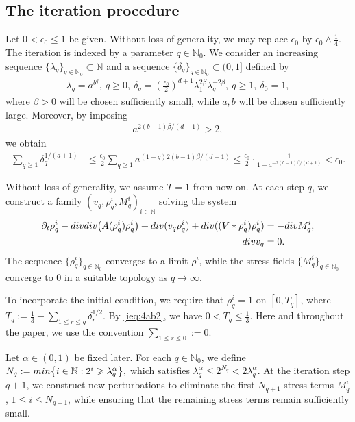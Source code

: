 \documentclass[10pt,a4paper]{amsart}
\numberwithin{equation}{section}
\def\min{{\mathord{{\rm min}}}}
\def\geq{\geqslant}
\def\leq{\leqslant}
\def\div{\mathord{{\rm div}}}
\def\min{{\mathord{{\rm min}}}}
\def\geq{\geqslant}
\def\leq{\leqslant}
\def\div{\mathord{{\rm div}}}
\begin{document}
\subsection{The iteration procedure}
Let $0<\epsilon_0\leq 1$ be given. Without loss of generality, we may replace $\epsilon_0$ by
$
\epsilon_0\wedge \frac14.
$ The iteration is indexed by a parameter
$
q\in\mathbb{N}_0.
$
We consider an increasing sequence
$
\{\lambda_q\}_{q\in\mathbb{N}_0}\subset\mathbb{N}
$
and a sequence
$
\{\delta_q\}_{q\in\mathbb{N}_0}\subset(0,1]
$
defined by
\begin{align*}
\lambda_q
=
a^{b^q},
\ 
q\geq0,
\ 
\delta_q
=
(\frac{\epsilon_0}{2})^{d+1}
\lambda_1^{2\beta}
\lambda_q^{-2\beta},
\ 
q\geq1,
\ 
\delta_0=1,
\end{align*}
where $\beta>0$ will be chosen sufficiently small, while $a,b$ will be chosen sufficiently large.
Moreover, by imposing
\begin{align}
a^{2(b-1)\beta/(d+1)}>2,
\label{ieq:4ab2}
\end{align}
we obtain
\begin{align*}
\sum_{q\geq1}\delta_q^{1/(d+1)}
&\leq
\frac{\epsilon_0}{2}
\sum_{q\geq1}
a^{(1-q)2(b-1)\beta/(d+1)}
\leq
\frac{\epsilon_0}{2}
\cdot
\frac1{1-a^{-2(b-1)\beta/(d+1)}}
<
\epsilon_0.
\end{align*} 
 

Without loss of generality, we assume $T=1$ from now on. 
At each step $q$, we construct a family
$(v_q,\rho_q^i,M_q^i)_{i\in\mathbb{N}}$
solving the system
\begin{align}\label{eq:4qth}
\partial_t\rho_q^i
-
\div\div\bigl(A(\rho_q^i)\rho_q^i\bigr)
+
\div(v_q\rho_q^i)+\div((V*\rho_q^i)\rho_q^i)
&=
-\div M_q^i,
\\
\div v_q&=0.
\notag
\end{align}
The sequence $\{\rho_q^i\}_{q\in\mathbb{N}_0}$ converges to a limit $\rho^i$, while the stress fields $\{M_q^i\}_{q\in\mathbb{N}_0}$ converge to $0$ in a suitable topology as $q\to\infty$.

To incorporate the initial condition, we require that
$\rho_q^i=1$ on $[0,T_q]$, where
$
T_q:=\frac13-\sum_{1\leq r\leq q}\delta_r^{1/2}.
$
By \eqref{ieq:4ab2}, we have
$
0<T_q\leq \frac13.
$
Here and throughout the paper, we use the convention
$
\sum_{1\leq r\leq0}:=0.
$

Let $\alpha\in(0,1)$ be fixed later. 
For each $q\in\mathbb{N}_0$, we define
$
N_q:=\min\bigl\{i\in\mathbb{N}:2^i\geq\lambda_q^\alpha\bigr\},
$
which satisfies
$
\lambda_q^\alpha
\leq
2^{N_q}<2\lambda_q^\alpha.$
At the iteration step $q+1$, we construct new perturbations to eliminate the first $N_{q+1}$ stress terms
$M_q^i$, $1\leq i\leq N_{q+1}$,
while ensuring that the remaining stress terms remain sufficiently small.
\end{document}
